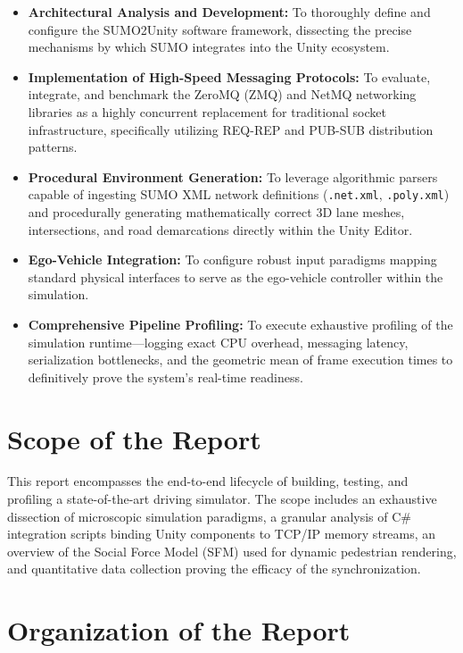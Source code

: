 \begin{itemize}[label={\color{AccentTeal}$\blacktriangleright$}, leftmargin=2em, itemsep=4pt]
    \item \textbf{Architectural Analysis and Development:} To thoroughly define and configure the SUMO2Unity software framework, dissecting the precise mechanisms by which SUMO integrates into the Unity ecosystem.
    \item \textbf{Implementation of High-Speed Messaging Protocols:} To evaluate, integrate, and benchmark the ZeroMQ (ZMQ) and NetMQ networking libraries as a highly concurrent replacement for traditional socket infrastructure, specifically utilizing REQ-REP and PUB-SUB distribution patterns.
    \item \textbf{Procedural Environment Generation:} To leverage algorithmic parsers capable of ingesting SUMO XML network definitions (\texttt{.net.xml}, \texttt{.poly.xml}) and procedurally generating mathematically correct 3D lane meshes, intersections, and road demarcations directly within the Unity Editor.
    \item \textbf{Ego-Vehicle Integration:} To configure robust input paradigms mapping standard physical interfaces to serve as the ego-vehicle controller within the simulation.
    \item \textbf{Comprehensive Pipeline Profiling:} To execute exhaustive profiling of the simulation runtime—logging exact CPU overhead, messaging latency, serialization bottlenecks, and the geometric mean of frame execution times to definitively prove the system’s real-time readiness.
\end{itemize}

\section{Scope of the Report}

This report encompasses the end-to-end lifecycle of building, testing, and profiling a state-of-the-art driving simulator. The scope includes an exhaustive dissection of microscopic simulation paradigms, a granular analysis of C\# integration scripts binding Unity components to TCP/IP memory streams, an overview of the Social Force Model (SFM) used for dynamic pedestrian rendering, and quantitative data collection proving the efficacy of the synchronization. 

\section{Organization of the Report}

